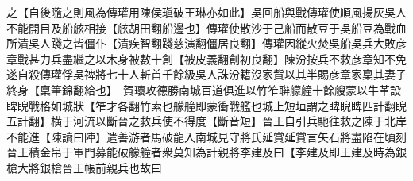 之【自後隨之則風為傳瓘用陳侯瑱破王琳亦如此】吳回船與戰傳瓘使順風揚灰吳人不能開目及船舷相接【舷胡田翻船邊也】傳瓘使散沙于己船而散豆于吳船豆為戰血所漬吳人踐之皆僵仆【漬疾智翻踐慈演翻僵居良翻】傳瓘因縱火焚吳船吳兵大敗彦章戰甚力兵盡繼之以木身被數十創【被皮義翻創初良翻】陳汾按兵不救彦章知不免遂自殺傳瓘俘吳禆將七十人斬首千餘級吳人誅汾籍沒家貲以其半賜彦章家稟其妻子終身【稟筆錦翻給也】　賀瓌攻德勝南城百道俱進以竹笮聨艨艟十餘艘蒙以牛革設睥睨戰格如城狀【笮才各翻竹索也艨艟即蒙衝戰艦也城上短垣謂之睥睨睥匹計翻睨五計翻】横于河流以斷晉之救兵使不得度【斷音短】晉王自引兵馳往救之陳于北岸不能進【陳讀曰陣】遣善游者馬破龍入南城見守將氏延賞延賞言矢石將盡陷在頃刻晉王積金帛于軍門募能破艨艟者衆莫知為計親將李建及曰【李建及即王建及時為銀槍大將銀槍晉王帳前親兵也故曰